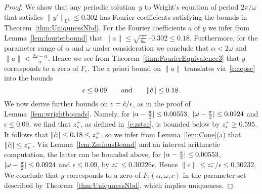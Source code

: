 \begin{proof}
We show that any periodic solution~$y$ to Wright's equation of period $2\pi/\omega$ that satisfies 
$ \| y' \|_{L^2} \leq 0.302$ 
has Fourier coefficients satisfying the bounds in Theorem~\ref{thm:UniqunessNbd}.
For the Fourier coefficients $a$ of $y$ we infer from Lemma~\ref{lem:fourierbound} that 
$\| a \| \leq \sqrt{\frac{\pi}{6\omega}} \cdot 0.302 \leq 0.18 $. 
Furthermore, for the parameter range of $\alpha$ and $\omega$ under consideration we conclude that $\alpha < 2\omega $ and 
$\|a\| < \frac{2\omega-\alpha}{\alpha}$. Hence we see from Theorem~\ref{thm:FourierEquivalence3}
that $y$ corresponds to a zero of $F_\epsilon$. 
The a priori bound on $\|a\|$ translates via~\eqref{e:aepsc} into the bounds
\[
\epsilon \leq 0.09
\qquad\text{and}\qquad
\| \tilde{c} \| \leq 0.18 .
\]
We now derive further bounds on $c=\tilde{c}/\epsilon$, 
 as in the proof of Lemma~\ref{lem:wrightbounds}.
Namely, for 
	$|\alpha-\tfrac{\pi}{2}| \leq 0.00553$,
	$|\omega-\tfrac{\pi}{2}| \leq 0.0924$ and  $\epsilon \leq 0.09$,
we find that  $z_*^+$, as defined in~\eqref{e:zstar}, is bounded below by 
 $z^+_* \geq 0.595$. 
It follows that 
$ \| \tilde{c} \|  \leq 0.18 \leq z^+_*$, 
so we infer from Lemma~\ref{lem:Cone}(a) that 
$\| \tilde{c} \| \leq z^-_* $.
Via Lemma~\ref{lem:ZminusBound} and an interval arithmetic computation, the latter can be bounded above, for 
	 $|\alpha-\tfrac{\pi}{2}| \leq 0.00553$,
	$|\omega-\tfrac{\pi}{2}| \leq 0.0924$ and  $\epsilon \leq 0.09$, by
	$z_*^- \leq 0.30226 \epsilon$. 
Hence 
 $\| c \| \leq z_*^- / \epsilon \leq 0.30232$.
%
We conclude that $y$ corresponds to a zero of $F_\epsilon(\alpha,\omega,c)$ in the parameter set described by Theorem~\ref{thm:UniqunessNbd}, which implies uniqueness.
\end{proof}

